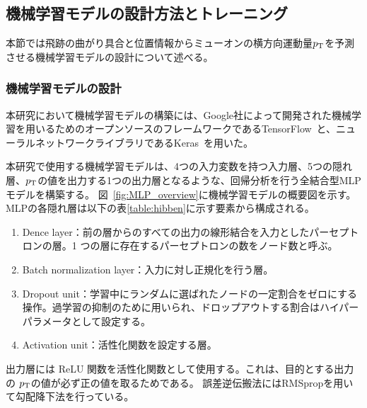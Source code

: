 

\subsection{機械学習モデルの設計方法とトレーニング}
本節では飛跡の曲がり具合と位置情報からミューオンの横方向運動量$p_{\rm{T}}$を予測させる機械学習モデルの設計について述べる。

\subsubsection{機械学習モデルの設計}
本研究において機械学習モデルの構築には、Google社によって開発された機械学習を用いるためのオープンソースのフレームワークであるTensorFlow~\cite{article:TensorFlow}と、ニューラルネットワークライブラリであるKeras~\cite{article:keras}を用いた。

本研究で使用する機械学習モデルは、4つの入力変数を持つ入力層、5つの隠れ層、$p_{\rm{T}}$の値を出力する1つの出力層となるような、回帰分析を行う全結合型MLPモデルを構築する。
図~\ref{fig:MLP_overview}に機械学習モデルの概要図を示す。
MLPの各隠れ層は以下の表\ref{table:hibben}に示す要素から構成される。
\begin{enumerate}\label{table:hibben}
   \item Dence layer：前の層からのすべての出力の線形結合を入力としたパーセプトロンの層。1 つの層に存在するパーセプトロンの数をノード数と呼ぶ。
   \item Batch normalization layer：入力に対し正規化を行う層。
   \item Dropout unit：学習中にランダムに選ばれたノードの一定割合をゼロにする操作。過学習の抑制のために用いられ、ドロップアウトする割合はハイパーパラメータとして設定する。
   \item Activation unit：活性化関数を設定する層。
\end{enumerate}
出力層には ReLU 関数を活性化関数として使用する。これは、目的とする出力の $p_{\rm{T}}$の値が必ず正の値を取るためである。
誤差逆伝搬法にはRMSpropを用いて勾配降下法を行っている。

